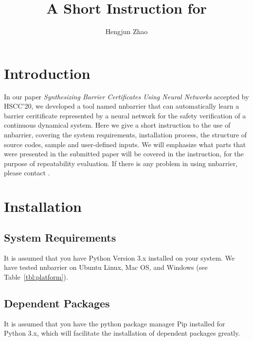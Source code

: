 \documentclass{llncs}
\begin{document}
%
\title{A Short Instruction for }
%
%
\author{Hengjun Zhao}

%
\maketitle %
%
%
%
\section{Introduction}
In our paper \emph{Synthesizing Barrier Certificates Using Neural Networks} accepted by HSCC'20, we developed a tool named \textsf{nnbarrier}
that can automatically learn a barrier ceritificate represented by a neural network for the safety verification of a continuous dynamical system. 
Here we give a short instruction to the use of \textsf{nnbarrier}, covering the system requirements, installation process, the structure of source codes,
sample and user-defined inputs. We will emphasize what parts that were presented in the submitted paper will be covered in the instruction, for the purpose of repeatability
evaluation. If there is any problem in using \textsf{nnbarrier}, please contact .

\section{Installation}

\subsection{System Requirements}
It is assumed that you have \textsf{Python Version 3.x}  installed on your system.
We have tested \textsf{nnbarrier} on Ubuntu Linux, Mac OS, and Windows (see Table~\ref{tbl:platform}).

\subsection{Dependent Packages}
It is assumed that you have the python package manager \textsf{Pip} installed for \textsf{Python 3.x}, which will facilitate
the installation of dependent packages greatly. 
\end{document}
